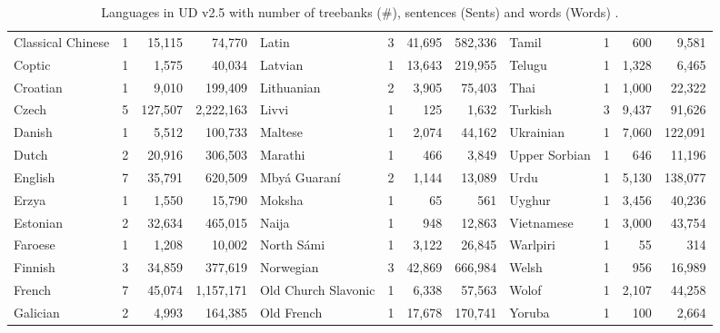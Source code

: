 \begin{table}[t]{}
\begin{adjustbox}{center,scale=0.85}
\begin{tabular}{|lrrr|lrrr|lrrr|}
Classical Chinese &1 &15,115 &74,770 &Latin &3 &41,695 &582,336 &Tamil &1 &600 &9,581 \\
Coptic &1 &1,575 &40,034 &Latvian &1 &13,643 &219,955 &Telugu &1 &1,328 &6,465 \\
Croatian &1 &9,010 &199,409 &Lithuanian &2 &3,905 &75,403 &Thai &1 &1,000 &22,322 \\
Czech &5 &127,507 &2,222,163 &Livvi &1 &125 &1,632 &Turkish &3 &9,437 &91,626 \\
Danish &1 &5,512 &100,733 &Maltese &1 &2,074 &44,162 &Ukrainian &1 &7,060 &122,091 \\
Dutch &2 &20,916 &306,503 &Marathi &1 &466 &3,849 &Upper Sorbian &1 &646 &11,196 \\
English &7 &35,791 &620,509 &Mby\'a Guaran\'i &2 &1,144 &13,089 &Urdu &1 &5,130 &138,077 \\
Erzya &1 &1,550 &15,790 &Moksha &1 &65 &561 &Uyghur &1 &3,456 &40,236 \\
Estonian &2 &32,634 &465,015 &Naija &1 &948 &12,863 &Vietnamese &1 &3,000 &43,754 \\
Faroese &1 &1,208 &10,002 &North S\'ami &1 &3,122 &26,845 &Warlpiri &1 &55 &314 \\
Finnish &3 &34,859 &377,619 &Norwegian &3 &42,869 &666,984 &Welsh &1 &956 &16,989 \\
French &7 &45,074 &1,157,171 &Old Church Slavonic &1 &6,338 &57,563 &Wolof &1 &2,107 &44,258 \\
Galician &2 &4,993 &164,385 &Old French &1 &17,678 &170,741 &Yoruba &1 &100 &2,664 \\
\hline
    \end{tabular}
\end{adjustbox}
    \caption{Languages in UD v2.5 with number of treebanks (\#), sentences (Sents) and words (Words) \citep{nivre2020}.}
    \label{tab:treebanks}
\end{table}
